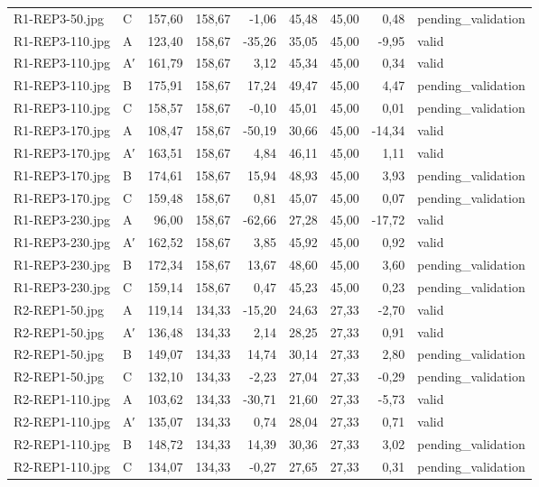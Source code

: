 \begin{scriptsize}
\begin{longtable}{@{}llrrrrrrl@{}}
R1-REP3-50.jpg & C & 157,60 & 158,67 & -1,06 & 45,48 & 45,00 & 0,48 & pending\_validation \\
R1-REP3-110.jpg & A & 123,40 & 158,67 & -35,26 & 35,05 & 45,00 & -9,95 & valid \\
R1-REP3-110.jpg & A′ & 161,79 & 158,67 & 3,12 & 45,34 & 45,00 & 0,34 & valid \\
R1-REP3-110.jpg & B & 175,91 & 158,67 & 17,24 & 49,47 & 45,00 & 4,47 & pending\_validation \\
R1-REP3-110.jpg & C & 158,57 & 158,67 & -0,10 & 45,01 & 45,00 & 0,01 & pending\_validation \\
R1-REP3-170.jpg & A & 108,47 & 158,67 & -50,19 & 30,66 & 45,00 & -14,34 & valid \\
R1-REP3-170.jpg & A′ & 163,51 & 158,67 & 4,84 & 46,11 & 45,00 & 1,11 & valid \\
R1-REP3-170.jpg & B & 174,61 & 158,67 & 15,94 & 48,93 & 45,00 & 3,93 & pending\_validation \\
R1-REP3-170.jpg & C & 159,48 & 158,67 & 0,81 & 45,07 & 45,00 & 0,07 & pending\_validation \\
R1-REP3-230.jpg & A & 96,00 & 158,67 & -62,66 & 27,28 & 45,00 & -17,72 & valid \\
R1-REP3-230.jpg & A′ & 162,52 & 158,67 & 3,85 & 45,92 & 45,00 & 0,92 & valid \\
R1-REP3-230.jpg & B & 172,34 & 158,67 & 13,67 & 48,60 & 45,00 & 3,60 & pending\_validation \\
R1-REP3-230.jpg & C & 159,14 & 158,67 & 0,47 & 45,23 & 45,00 & 0,23 & pending\_validation \\
R2-REP1-50.jpg & A & 119,14 & 134,33 & -15,20 & 24,63 & 27,33 & -2,70 & valid \\
R2-REP1-50.jpg & A′ & 136,48 & 134,33 & 2,14 & 28,25 & 27,33 & 0,91 & valid \\
R2-REP1-50.jpg & B & 149,07 & 134,33 & 14,74 & 30,14 & 27,33 & 2,80 & pending\_validation \\
R2-REP1-50.jpg & C & 132,10 & 134,33 & -2,23 & 27,04 & 27,33 & -0,29 & pending\_validation \\
R2-REP1-110.jpg & A & 103,62 & 134,33 & -30,71 & 21,60 & 27,33 & -5,73 & valid \\
R2-REP1-110.jpg & A′ & 135,07 & 134,33 & 0,74 & 28,04 & 27,33 & 0,71 & valid \\
R2-REP1-110.jpg & B & 148,72 & 134,33 & 14,39 & 30,36 & 27,33 & 3,02 & pending\_validation \\
R2-REP1-110.jpg & C & 134,07 & 134,33 & -0,27 & 27,65 & 27,33 & 0,31 & pending\_validation \\

\end{longtable}
\end{scriptsize}
